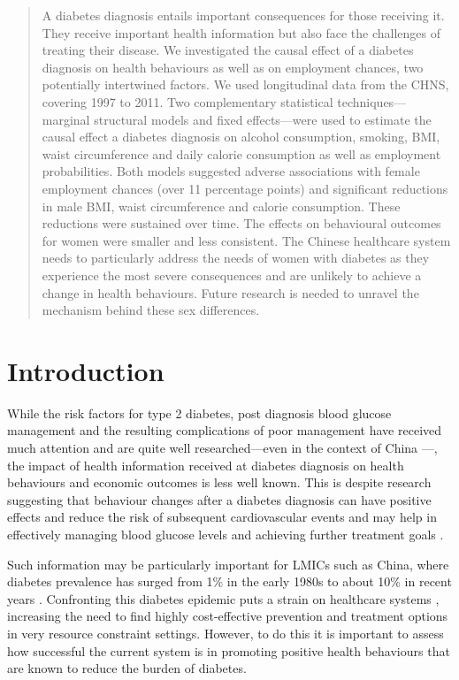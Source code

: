 
\begin{abstract}
A diabetes diagnosis entails important consequences for those receiving it. They receive important health information but also face the challenges of treating their disease. We investigated the causal effect of a diabetes diagnosis on health behaviours as well as on employment chances, two potentially intertwined factors. We used longitudinal data from the \ac{CHNS}, covering 1997 to 2011. Two complementary statistical techniques---marginal structural models and fixed effects---were used to estimate the causal effect a diabetes diagnosis on alcohol consumption, smoking, BMI, waist circumference and daily calorie consumption as well as employment probabilities. Both models suggested adverse associations with female employment chances (over 11 percentage points) and significant reductions in male \acf{BMI}, waist circumference and calorie consumption. These reductions were sustained over time. The effects on behavioural outcomes for women were smaller and less consistent. The Chinese healthcare system needs to particularly address the needs of women with diabetes as they experience the most severe consequences and are unlikely to achieve a change in health behaviours. Future research is needed to unravel the mechanism behind these sex differences.

\end{abstract}


\section{\label{sec:Introduction5}Introduction}

While the risk factors for type 2 diabetes, post diagnosis blood glucose management and the resulting complications of poor management have received much attention and are quite well researched---even in the context of China \parencite{Pan2015,Batis2014,Zhao2012,Ma2014,Chan2014,Yang2012}---, the impact of health information received at diabetes diagnosis on health behaviours and economic outcomes is less well known. This is despite research suggesting that behaviour changes after a diabetes diagnosis can have positive effects and reduce the risk of subsequent cardiovascular events\parencite{Long2014} and may help in effectively managing blood glucose levels and achieving further treatment goals \parencite{Zhou2016}.

Such information may be particularly important for \acp{LMIC} such as China, where diabetes prevalence has surged from 1\% in the early 1980s to about 10\% in recent years \autocite{Hu2011,Risk2016}. Confronting this diabetes epidemic puts a strain on healthcare systems \parencite{Seuring2015a}, increasing the need to find highly cost-effective prevention and treatment options in very resource constraint settings. However, to do this it is important to assess how successful the current system is in promoting positive health behaviours that are known to reduce the burden of diabetes.

